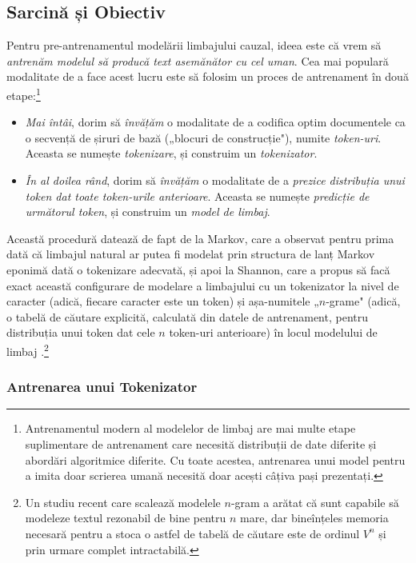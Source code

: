\documentclass[../../book-main_ro.tex]{subfiles}
\begin{document}
\subsection{Sarcină și Obiectiv} \label{sub:clm_text_objective}

Pentru pre-antrenamentul modelării limbajului cauzal, ideea este că vrem să \textit{antrenăm modelul să producă text asemănător cu cel uman}. Cea mai populară modalitate de a face acest lucru este să folosim un proces de antrenament în două etape:\footnote{Antrenamentul modern al modelelor de limbaj are mai multe etape suplimentare de antrenament care necesită distribuții de date diferite și abordări algoritmice diferite. Cu toate acestea, antrenarea unui model pentru a imita doar scrierea umană necesită doar acești câțiva pași prezentați.}
\begin{itemize}
    \item \textit{Mai întâi}, dorim să \textit{învățăm} o modalitate de a codifica optim documentele ca o secvență de șiruri de bază („blocuri de construcție"), numite \textit{token-uri}. Aceasta se numește \textit{tokenizare}, și construim un \textit{tokenizator}.
    \item \textit{În al doilea rând}, dorim să \textit{învățăm} o modalitate de a \textit{prezice distribuția unui token dat toate token-urile anterioare}. Aceasta se numește \textit{predicție de următorul token}, și construim un \textit{model de limbaj}.
\end{itemize}
Această procedură datează de fapt de la Markov, care a observat pentru prima dată că limbajul natural ar putea fi modelat prin structura de lanț Markov eponimă \citep{markov2006example} dată o tokenizare adecvată, și apoi la Shannon, care a propus să facă exact această configurare de modelare a limbajului cu un tokenizator la nivel de caracter (adică, fiecare caracter este un token) și așa-numitele „\(n\)-grame" (adică, o tabelă de căutare explicită, calculată din datele de antrenament, pentru distribuția unui token dat cele \(n\) token-uri anterioare) în locul modelului de limbaj \citep{Shannon-1948}.\footnote{Un studiu recent \citep{liu2024infini} care scalează modelele \(n\)-gram a arătat că sunt capabile să modeleze textul rezonabil de bine pentru \(n\) mare, dar bineînțeles memoria necesară pentru a stoca o astfel de tabelă de căutare este de ordinul \(V^{n}\) și prin urmare complet intractabilă.}

\subsubsection{Antrenarea unui Tokenizator}
\end{document}
